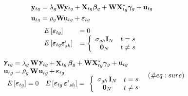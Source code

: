 \documentclass[10pt,a4paper]{article}
\begin{document}
\begin{align}
 {\bf y}_{tg} &= \lambda_{g} {\bf W}{\bf y}_{tg} + {\bf X}_{tg} {\boldsymbol \beta}_{g} + 
 {\bf W} {\bf X}_{tg}^* {\boldsymbol \gamma}_{g} + {\bf u}_{tg}   \\
{\bf u}_{tg} &= \rho_{g} {\bf W} {\bf u}_{tg} + {\boldsymbol \varepsilon}_{tg}  \nonumber  
\end{align}
\begin{align*}
\begin{array}{ll} 
E \left[ {\boldsymbol \varepsilon}_{tg} \right] &= 0 \\ 
E \left[ {\boldsymbol \varepsilon}_{tg} {\boldsymbol \varepsilon}'_{sh} \right] &=
\left\{ \begin{array}{cc} 
\sigma_{gh} {\bf I}_{N} & t = s \\ 
{\bf 0}_{N} & t \ne s 
\end{array} \right.
\end{array}
\end{align*}

\begin{equation}
\left.\begin{array}{lll}
{\mathop{{\bf y}}\nolimits_{tg} =\mathop{\lambda }\nolimits_{g} {\bf W} \mathop{{\bf y}}\nolimits_{tg} +\mathop{{\bf X}}\nolimits_{tg} {\boldsymbol \beta}_{g}+{\bf W} {\bf X}_{tg}^* {\boldsymbol \gamma}_{g}+\mathop{{\bf u}}\nolimits_{tg} } \\
{\mathop{{\bf u}}\nolimits_{tg} =\mathop{\rho }\nolimits_{g} {\bf W} \mathop{{\bf u}}\nolimits_{tg} +\mathop{{\boldsymbol \varepsilon}}\nolimits_{tg} }\\
\begin{array}{cc} 
{E\left[\mathop{{\boldsymbol \varepsilon}}\nolimits_{tg} \right]=0} & {E\left[\mathop{{\boldsymbol \varepsilon}}\nolimits_{\mathop{tg}} \mathop{{\boldsymbol \varepsilon}'}\nolimits_{\mathop{sh}} \right]=}
\end{array}
\left\{ \begin{array}{cc} {\mathop{\sigma}\nolimits_{gh} {\bf I}_{N}} & {\mathop{t} = \mathop{s}} \\ {{\bf 0}_{N} } & {\mathop{t} \ne \mathop{s} }
\end{array}\right. 
\end{array}\right.
(\#eq:sure)
\end{equation}
\end{document}

